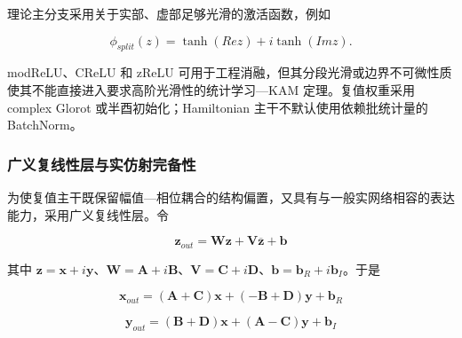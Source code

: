 理论主分支采用关于实部、虚部足够光滑的激活函数，例如

\begin{equation}
\label{eq:chnn-4-7}
\phi_{split}(z) = \tanh(Rez) + i\tanh(Imz).
\end{equation}

modReLU、CReLU 和 zReLU 可用于工程消融，但其分段光滑或边界不可微性质使其不能直接进入要求高阶光滑性的统计学习---KAM 定理。复值权重采用 complex Glorot 或半酉初始化；Hamiltonian 主干不默认使用依赖批统计量的 BatchNorm\cite{Trabelsi2018DeepComplex,Hirose2012CVNN}。

\subsubsection{广义复线性层与实仿射完备性}\label{sec:chnn-4-2-3}

为使复值主干既保留幅值---相位耦合的结构偏置，又具有与一般实网络相容的表达能力，采用广义复线性层。令

\begin{equation}
\label{eq:chnn-4-8}
\mathbf{z}_{out} = \mathbf{W}\mathbf{z} + \mathbf{V}\overline{\mathbf{z}} + \mathbf{b}
\end{equation}

其中 \(\mathbf{z} = \mathbf{x} + i\mathbf{y}\)、\(\mathbf{W} = \mathbf{A} + i\mathbf{B}\)、\(\mathbf{V} = \mathbf{C} + i\mathbf{D}\)、\(\mathbf{b} = \mathbf{b}_{R} + i\mathbf{b}_{I}\)。于是

\begin{equation}
\label{eq:chnn-4-9}
\mathbf{x}_{out} = \left( \mathbf{A} + \mathbf{C} \right)\mathbf{x} + \left( - \mathbf{B} + \mathbf{D} \right)\mathbf{y} + \mathbf{b}_{R}
\end{equation}

\begin{equation}
\label{eq:chnn-4-10}
\mathbf{y}_{out} = \left( \mathbf{B} + \mathbf{D} \right)\mathbf{x} + \left( \mathbf{A} - \mathbf{C} \right)\mathbf{y} + \mathbf{b}_{I}
\end{equation}

